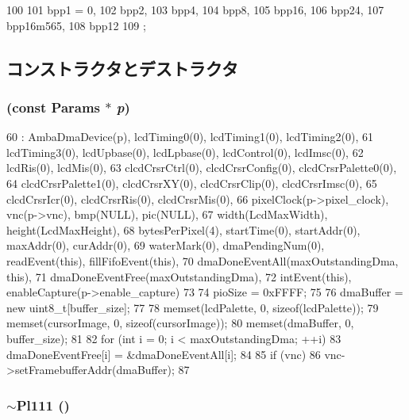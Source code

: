 \begin{DoxyCode}
100                  {
101         bpp1 = 0,
102         bpp2,
103         bpp4,
104         bpp8,
105         bpp16,
106         bpp24,
107         bpp16m565,
108         bpp12
109     };
\end{DoxyCode}


\subsection{コンストラクタとデストラクタ}
\hypertarget{classPl111_af9c40731047e4f40c32124db60dd4c19}{
\subsubsection[{Pl111}]{ (const {\bf Params} $\ast$ {\em p})}}
\label{classPl111_af9c40731047e4f40c32124db60dd4c19}



\begin{DoxyCode}
60     : AmbaDmaDevice(p), lcdTiming0(0), lcdTiming1(0), lcdTiming2(0),
61       lcdTiming3(0), lcdUpbase(0), lcdLpbase(0), lcdControl(0), lcdImsc(0),
62       lcdRis(0), lcdMis(0),
63       clcdCrsrCtrl(0), clcdCrsrConfig(0), clcdCrsrPalette0(0),
64       clcdCrsrPalette1(0), clcdCrsrXY(0), clcdCrsrClip(0), clcdCrsrImsc(0),
65       clcdCrsrIcr(0), clcdCrsrRis(0), clcdCrsrMis(0),
66       pixelClock(p->pixel_clock), vnc(p->vnc), bmp(NULL), pic(NULL),
67       width(LcdMaxWidth), height(LcdMaxHeight),
68       bytesPerPixel(4), startTime(0), startAddr(0), maxAddr(0), curAddr(0),
69       waterMark(0), dmaPendingNum(0), readEvent(this), fillFifoEvent(this),
70       dmaDoneEventAll(maxOutstandingDma, this),
71       dmaDoneEventFree(maxOutstandingDma),
72       intEvent(this), enableCapture(p->enable_capture)
73 {
74     pioSize = 0xFFFF;
75 
76     dmaBuffer = new uint8_t[buffer_size];
77 
78     memset(lcdPalette, 0, sizeof(lcdPalette));
79     memset(cursorImage, 0, sizeof(cursorImage));
80     memset(dmaBuffer, 0, buffer_size);
81 
82     for (int i = 0; i < maxOutstandingDma; ++i)
83         dmaDoneEventFree[i] = &dmaDoneEventAll[i];
84 
85     if (vnc)
86         vnc->setFramebufferAddr(dmaBuffer);
87 }
\end{DoxyCode}
\hypertarget{classPl111_a2f88fbe458a30b5dfef6be54275440b8}{
\subsubsection[{$\sim$Pl111}]{\setlength{\rightskip}{0pt plus 5cm}$\sim${\bf Pl111} ()}}
\label{classPl111_a2f88fbe458a30b5dfef6be54275440b8}



